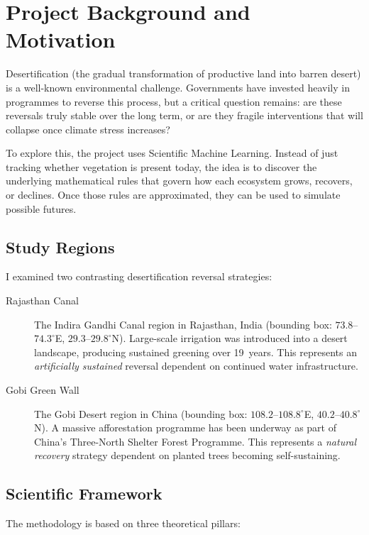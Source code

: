 \documentclass[12pt, a4paper]{article}
\begin{document}
\section{Project Background and Motivation}

Desertification (the gradual transformation of productive land into barren desert) is a well-known environmental challenge. Governments have invested heavily in programmes to reverse this process, but a critical question remains: are these reversals truly stable over the long term, or are they fragile interventions that will collapse once climate stress increases?

To explore this, the project uses Scientific Machine Learning. Instead of just tracking whether vegetation is present today, the idea is to discover the underlying mathematical rules that govern how each ecosystem grows, recovers, or declines. Once those rules are approximated, they can be used to simulate possible futures.

\subsection{Study Regions}

I examined two contrasting desertification reversal strategies:

\begin{description}
    \item[Rajasthan Canal] The Indira Gandhi Canal region in Rajasthan, India (bounding box: $73.8$--$74.3^{\circ}$E, $29.3$--$29.8^{\circ}$N). Large-scale irrigation was introduced into a desert landscape, producing sustained greening over 19~years. This represents an \emph{artificially sustained} reversal dependent on continued water infrastructure.
    \item[Gobi Green Wall] The Gobi Desert region in China (bounding box: $108.2$--$108.8^{\circ}$E, $40.2$--$40.8^{\circ}$N). A massive afforestation programme has been underway as part of China's Three-North Shelter Forest Programme. This represents a \emph{natural recovery} strategy dependent on planted trees becoming self-sustaining.
\end{description}

\subsection{Scientific Framework}

The methodology is based on three theoretical pillars:
\end{document}
